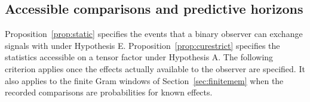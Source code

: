 \documentclass[aps,pra,onecolumn,superscriptaddress,nofootinbib,10pt]{revtex4-2}
\theoremstyle{definition}
\theoremstyle{remark}
\begin{document}

\subsection{Accessible comparisons and predictive horizons}\label{ob:horizons}\label{sec:horizons}

Proposition~\ref{prop:static} specifies the events that a binary observer
can exchange signals with under Hypothesis E. Proposition~\ref{prop:curestrict}
specifies the statistics accessible on a tensor factor under Hypothesis A.
The following criterion applies once the effects actually available to the
observer are specified. It also applies to the finite Gram windows of
Section~\ref{sec:finitemem} when the recorded comparisons are probabilities for
known effects.
\end{document}

